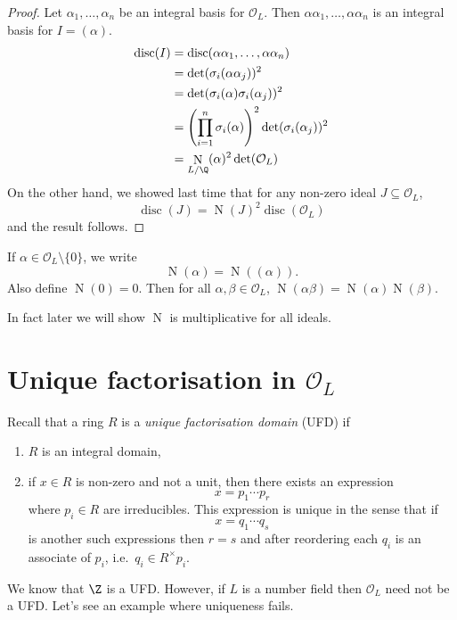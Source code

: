 \documentclass[a4paper]{article}
\renewcommand*{\O}{\mathcal{O}}
\DeclareMathOperator{\n}{N}
\DeclareMathOperator{\disc}{disc}
\begin{document}
\begin{proof}
  Let \(\alpha_1, \dots, \alpha_n\) be an integral basis for \(\O_L\). Then \(\alpha\alpha_1, \dots, \alpha\alpha_n\) is an integral basis for \(I = (\alpha)\).
  \begin{align*}
    \disc(I) 
    &= \disc(\alpha\alpha_1, \dots, \alpha\alpha_n) \\
    &= \det(\sigma_i(\alpha\alpha_j))^2 \\
    &= \det (\sigma_i(\alpha)\sigma_i(\alpha_j))^2 \\
    &= \left( \prod_{i = 1}^n \sigma_i(\alpha) \right)^2 \det(\sigma_i(\alpha_j))^2 \\
    &= \n_{L/\Q}(\alpha)^2 \det(\O_L)
  \end{align*}
  On the other hand, we showed last time that for any non-zero ideal \(J \subseteq \O_L\),
  \[
    \disc(J) = \n(J)^2 \disc(\O_L)
  \]
  and the result follows.
\end{proof}

\begin{notation}
  If \(\alpha \in \O_L \setminus \{0\}\), we write
  \[
    \n(\alpha) = \n((\alpha)).
  \]
  Also define \(\n(0) = 0\). Then for all \(\alpha, \beta \in \O_L\), \(\n(\alpha\beta) = \n(\alpha)\n(\beta)\).
\end{notation}

In fact later we will show \(\n\) is multiplicative for all ideals.

\section{Unique factorisation in \texorpdfstring{\(\O_L\)}{O\_L}}

Recall that a ring \(R\) is a \emph{unique factorisation domain} (UFD) if
\begin{enumerate}
\item \(R\) is an integral domain,
\item if \(x \in R\) is non-zero and not a unit, then there exists an expression
  \[
    x = p_1 \cdots p_r
  \]
  where \(p_i \in R\) are irreducibles. This expression is unique in the sense that if
  \[
    x = q_1 \cdots q_s
  \]
  is another such expressions then \(r = s\) and after reordering each \(q_i\) is an associate of \(p_i\), i.e.\ \(q_i \in R^\times p_i\).
\end{enumerate}

We know that \(\Z\) is a UFD. However, if \(L\) is a number field then \(\O_L\) need not be a UFD. Let's see an example where uniqueness fails.
\end{document}
